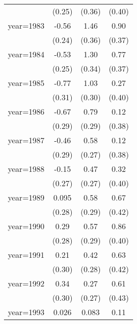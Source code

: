\begin{sidewaystable}[htbp]
\begin{tabular}{l*{3}{c}}
                &   (0.25)         &   (0.36)         &   (0.40)         \\
\addlinespace
year=1983       &    -0.56\sym{**} &     1.46\sym{***}&     0.90\sym{**} \\
                &   (0.24)         &   (0.36)         &   (0.37)         \\
\addlinespace
year=1984       &    -0.53\sym{**} &     1.30\sym{***}&     0.77\sym{**} \\
                &   (0.25)         &   (0.34)         &   (0.37)         \\
\addlinespace
year=1985       &    -0.77\sym{**} &     1.03\sym{***}&     0.27         \\
                &   (0.31)         &   (0.30)         &   (0.40)         \\
\addlinespace
year=1986       &    -0.67\sym{**} &     0.79\sym{***}&     0.12         \\
                &   (0.29)         &   (0.29)         &   (0.38)         \\
\addlinespace
year=1987       &    -0.46         &     0.58\sym{**} &     0.12         \\
                &   (0.29)         &   (0.27)         &   (0.38)         \\
\addlinespace
year=1988       &    -0.15         &     0.47\sym{*}  &     0.32         \\
                &   (0.27)         &   (0.27)         &   (0.40)         \\
\addlinespace
year=1989       &    0.095         &     0.58\sym{**} &     0.67         \\
                &   (0.28)         &   (0.29)         &   (0.42)         \\
\addlinespace
year=1990       &     0.29         &     0.57\sym{*}  &     0.86\sym{**} \\
                &   (0.28)         &   (0.29)         &   (0.40)         \\
\addlinespace
year=1991       &     0.21         &     0.42         &     0.63         \\
                &   (0.30)         &   (0.28)         &   (0.42)         \\
\addlinespace
year=1992       &     0.34         &     0.27         &     0.61         \\
                &   (0.30)         &   (0.27)         &   (0.43)         \\
\addlinespace
year=1993       &    0.026         &    0.083         &     0.11         \\

\end{tabular}
\end{sidewaystable}
